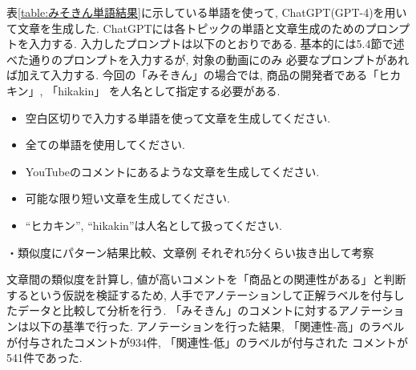 \documentclass{ltjarticle}
\begin{document}
表\ref{table:みそきん単語結果}に示している単語を使って, ChatGPT(GPT-4)を用いて文章を生成した. 
ChatGPTには各トピックの単語と文章生成のためのプロンプトを入力する. 
入力したプロンプトは以下のとおりである. 基本的には5.4節で述べた通りのプロンプトを入力するが, 対象の動画にのみ
必要なプロンプトがあれば加えて入力する. 今回の「みそきん」の場合では, 商品の開発者である「ヒカキン」, 「hikakin」
を人名として指定する必要がある. 
\begin{itemize}
    \item 空白区切りで入力する単語を使って文章を生成してください.
    \item 全ての単語を使用してください.
    \item YouTubeのコメントにあるような文章を生成してください.
    \item 可能な限り短い文章を生成してください.
    \item ``ヒカキン'', ``hikakin''は人名として扱ってください.
\end{itemize}

\newpage
・類似度にパターン結果比較、文章例
それぞれ5分くらい抜き出して考察

文章間の類似度を計算し, 値が高いコメントを「商品との関連性がある」と判断するという仮説を検証するため, 
人手でアノテーションして正解ラベルを付与したデータと比較して分析を行う. 
「みそきん」のコメントに対するアノテーションは以下の基準で行った. 
アノテーションを行った結果, 「関連性-高」のラベルが付与されたコメントが934件, 「関連性-低」のラベルが付与された
コメントが541件であった. 
\vspace{10truept}
\end{document}
